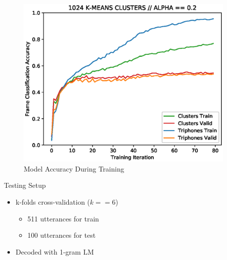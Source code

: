 \documentclass[final]{beamer} %
\newlength{\columnheight}
\begin{document}
\begin{frame}
\begin{columns}
\begin{column}{0.23\textwidth}
{        \vfill

        \begin{figure}[!htbp]
          \centering
          \includegraphics[width=\linewidth]{figs/1_point_2_1024.eps}
          \caption{Model Accuracy During Training}
          \endminipage\hfill
        \end{figure}

        
        \vfill

        
        \begin{block}{\boxnumber Testing Setup}
          \begin{itemize}
          \item k-folds cross-validation ($k==6$)
            \begin{itemize}
            \item 511 utterances for train
            \item 100 utterances for test
            \end{itemize}
            \item Decoded with 1-gram LM      
          \end{itemize}
        \end{block}

        \vfill
        

      } %
    \end{column}




    
    \begin{column}{0.23\textwidth}
      \parbox[t][\columnheight]{.9\textwidth}{
          
}
\end{column}
\end{columns}
\end{frame}
\end{document}
